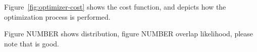 Figure~\ref{fig:optimizer-cost} shows the cost function,
and depicts how the optimization process is performed.

Figure NUMBER shows distribution,
figure NUMBER overlap likelihood,
please note that is good.

